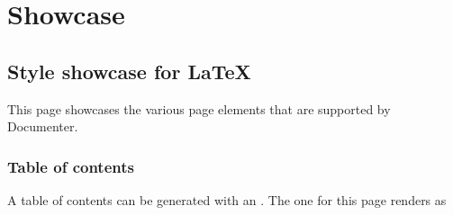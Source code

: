 \newcommand{\DocMainTitle}{Documenter LaTeX Showcase}
\newcommand{\DocVersion}{1.2.3}
\newcommand{\DocAuthors}{}
\newcommand{\JuliaVersion}{1.12.4}




\part{Showcase}


\chapter{Style showcase for \LaTeX}



\label{5852870456629818970}{}


This page showcases the various page elements that are supported by Documenter.



\section{Table of contents}



\label{11192443102986465861}{}


A table of contents can be generated with an . The one for this page renders as


